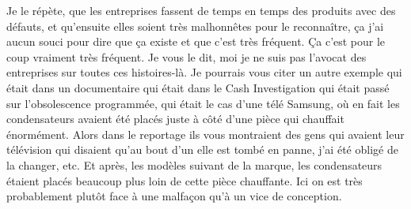\begin{small}
Je le répète, que les entreprises fassent de temps en temps des produits avec des défauts, et qu'ensuite elles soient très malhonnêtes pour le reconnaître, ça j'ai aucun souci pour dire que ça existe et que c'est très fréquent. Ça c'est pour le coup vraiment très fréquent. Je vous le dit, moi je ne suis pas l'avocat des entreprises sur toutes ces histoires-là.
Je pourrais vous citer un autre exemple qui était dans un documentaire qui était dans le Cash Investigation qui était passé sur l'obsolescence programmée, qui était le cas d'une télé Samsung, où en fait les condensateurs avaient été placés juste à côté d'une pièce qui chauffait énormément. Alors dans le reportage ils vous montraient des gens qui avaient leur télévision qui disaient qu'au bout d'un elle est tombé en panne, j'ai été obligé de la changer, etc. Et après, les modèles suivant de la marque, les condensateurs étaient placés beaucoup plus loin de cette pièce chauffante. Ici on est très probablement plutôt face à une malfaçon qu'à un vice de conception. 

\end{small}
